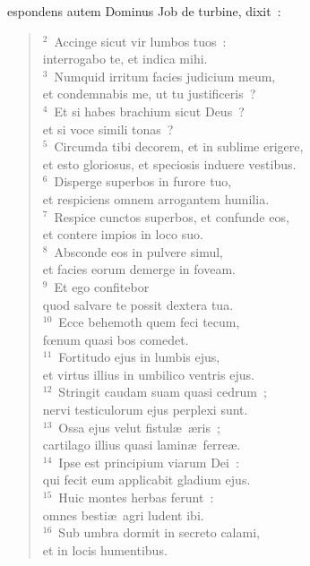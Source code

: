 \bchapter
{}espondens autem Dominus Job de turbine, dixit~:
\begin{flushleft}\begin{verse}\vspace{6pt}${}^{2}$~Accinge sicut vir lumbos tuos~:\\ interrogabo te, et indica mihi.\\
${}^{3}$~Numquid irritum facies judicium meum,\\ et condemnabis me, ut tu justificeris~?\\
${}^{4}$~Et si habes brachium sicut Deus~?\\ et si voce simili tonas~?\\
${}^{5}$~Circumda tibi decorem, et in sublime erigere,\\ et esto gloriosus, et speciosis induere vestibus.\\
${}^{6}$~Disperge superbos in furore tuo,\\ et respiciens omnem arrogantem humilia.\\
${}^{7}$~Respice cunctos superbos, et confunde eos,\\ et contere impios in loco suo.\\
${}^{8}$~Absconde eos in pulvere simul,\\ et facies eorum demerge in foveam.\\
${}^{9}$~Et ego confitebor\\ quod salvare te possit dextera tua.\\
${}^{10}$~Ecce behemoth quem feci tecum,\\ fœnum quasi bos comedet.\\
${}^{11}$~Fortitudo ejus in lumbis ejus,\\ et virtus illius in umbilico ventris ejus.\\
${}^{12}$~Stringit caudam suam quasi cedrum~;\\ nervi testiculorum ejus perplexi sunt.\\
${}^{13}$~Ossa ejus velut fistul\ae\ \ae ris~;\\ cartilago illius quasi lamin\ae\ ferre\ae .\\
${}^{14}$~Ipse est principium viarum Dei~:\\ qui fecit eum applicabit gladium ejus.\\
${}^{15}$~Huic montes herbas ferunt~:\\ omnes besti\ae\ agri ludent ibi.\\
${}^{16}$~Sub umbra dormit in secreto calami,\\ et in locis humentibus.\\

\end{verse}
\end{flushleft}
